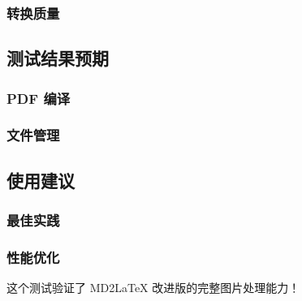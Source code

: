 \documentclass[UTF8, a4paper, 12pt]{ctexart}
\begin{document}
\subsubsection{转换质量}

\subsection{测试结果预期}


\subsubsection{PDF 编译}

\subsubsection{文件管理}

\subsection{使用建议}


\subsubsection{最佳实践}

\subsubsection{性能优化}

这个测试验证了 MD2LaTeX 改进版的完整图片处理能力！
\end{document}
